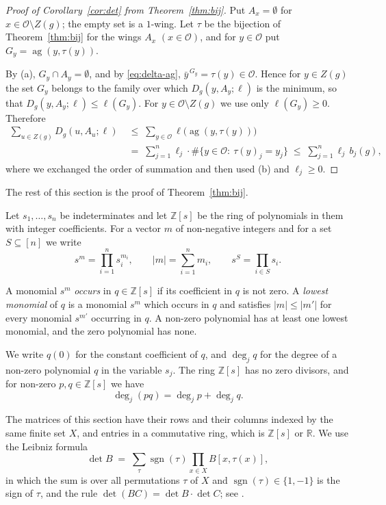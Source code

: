 \documentclass[11pt,reqno]{amsart}
\makeatletter
\theoremstyle{definition}
\theoremstyle{remark}
\numberwithin{equation}{section}
\theoremstyle{named}
\theoremstyle{plain}
\renewcommand{\subsection}{\@startsection{subsection}{2}%
  \z@{1.0\linespacing\@plus.4\linespacing\@minus.15\linespacing}{-.5em}{\normalfont\bfseries}}
\newcommand{\R}{\mathbb{R}}
\newcommand{\Z}{\mathbb{Z}}
\newcommand{\ag}{\operatorname{ag}}
\newcommand{\sgn}{\operatorname{sgn}}
\newcommand{\cO}{\mathcal{O}}
\newcommand{\abs}[1]{\lvert #1\rvert}
\makeatother
\begin{document}
\begin{proof}[Proof of Corollary~\ref{cor:det} from Theorem~\ref{thm:bij}]
Put $A_x=\emptyset$ for $x\in\cO\setminus Z(g)$; the empty set is a $1$-wing. Let $\tau$ be the
bijection of Theorem~\ref{thm:bij} for the wings $A_x$ $(x\in\cO)$, and for $y\in\cO$ put
$G_y=\ag(y,\tau(y))$.

By (a), $G_y\cap A_y=\emptyset$, and by \eqref{eq:delta-ag},
$\bar y^{\,G_y}=\tau(y)\in\cO$. Hence for $y\in Z(g)$ the set $G_y$ belongs to the family over which
$D_g(y,A_y;\ell)$ is the minimum, so that $D_g(y,A_y;\ell)\le\ell(G_y)$. For $y\in\cO\setminus Z(g)$
we use only $\ell(G_y)\ge0$. Therefore
\begin{align*}
   \sum_{u\in Z(g)}D_g(u,A_u;\ell)&\;\le\;\sum_{y\in\cO}\ell\bigl(\ag(y,\tau(y))\bigr)\\
   &\;=\;\sum_{j=1}^{n}\ell_j\cdot\#\{y\in\cO:\ \tau(y)_j=y_j\}\;\le\;\sum_{j=1}^{n}\ell_j\,b_j(g),
\end{align*}
where we exchanged the order of summation and then used (b) and $\ell_j\ge0$.
\end{proof}

The rest of this section is the proof of Theorem~\ref{thm:bij}.

\subsection{Lowest monomials}

Let $s_1,\dots,s_n$ be indeterminates and let $\Z[s]$ be the ring of polynomials in them with
integer coefficients. For a vector $m$ of non-negative integers and for a set $S\subseteq[n]$ we
write
\[
   s^{m}=\prod_{i=1}^{n}s_i^{m_i},\qquad \abs{m}=\sum_{i=1}^{n}m_i,\qquad s^{S}=\prod_{i\in S}s_i .
\]

A monomial $s^{m}$ \emph{occurs} in $q\in\Z[s]$ if its coefficient in $q$ is not zero. A
\emph{lowest monomial} of $q$ is a monomial $s^{m}$ which occurs in $q$ and satisfies
$\abs{m}\le\abs{m'}$ for every monomial $s^{m'}$ occurring in $q$. A non-zero polynomial has at
least one lowest monomial, and the zero polynomial has none.

We write $q(0)$ for the constant
coefficient of $q$, and $\deg_jq$ for the degree of a non-zero polynomial $q$ in the variable $s_j$.
The ring $\Z[s]$ has no zero divisors, and for non-zero $p,q\in\Z[s]$ we have
\[
   \deg_j(pq)=\deg_jp+\deg_jq .
\]

The matrices of this section have their rows and their columns indexed by the same finite set $X$,
and entries in a commutative ring, which is $\Z[s]$ or $\R$. We use the Leibniz formula
\begin{equation}\label{eq:leibniz}
   \det B\;=\;\sum_{\tau}\sgn(\tau)\prod_{x\in X}B[x,\tau(x)],
\end{equation}
in which the sum is over all permutations $\tau$ of $X$ and $\sgn(\tau)\in\{1,-1\}$ is the sign of
$\tau$, and the rule $\det(BC)=\det B\cdot\det C$; see \cite[Chapter~XIII, \S4]{Lang}.
\end{document}
